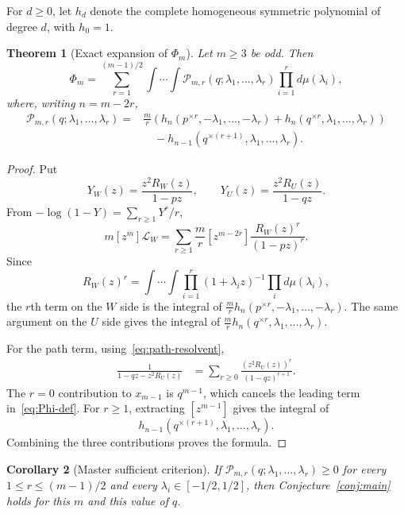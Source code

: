 \documentclass[11pt]{article}
\newtheorem{theorem}{Theorem}[section]
\newtheorem{corollary}[theorem]{Corollary}
\newcommand{\Pcal}{\mathcal P}
\begin{document}
For $d\ge0$, let $h_d$ denote the complete homogeneous symmetric polynomial of degree $d$, with $h_0=1$.

\begin{theorem}[Exact expansion of $\Phi_m$]\label{thm:expansion}
Let $m\ge3$ be odd.  Then
\begin{equation}\label{eq:Phi-expansion}
        \Phi_m=
        \sum_{r=1}^{(m-1)/2}\int\cdots\int
        \Pcal_{m,r}(q;\lambda_1,\ldots,\lambda_r)
        \prod_{i=1}^r d\mu(\lambda_i),
\end{equation}
where, writing $n=m-2r$,
\begin{equation}\label{eq:P-def}
\begin{aligned}
        \Pcal_{m,r}(q;\lambda_1,\ldots,\lambda_r)
        ={}&\frac mr\left(
        h_n(p^{\times r},-\lambda_1,\ldots,-\lambda_r)
        +h_n(q^{\times r},\lambda_1,\ldots,\lambda_r)
        \right)\\
        &\quad-h_{n-1}(q^{\times(r+1)},\lambda_1,\ldots,\lambda_r).
\end{aligned}
\end{equation}
\end{theorem}

\begin{proof}
Put
\[
        Y_W(z)=\frac{z^2R_W(z)}{1-pz},
        \qquad
        Y_U(z)=\frac{z^2R_U(z)}{1-qz}.
\]
From $-\log(1-Y)=\sum_{r\ge1}Y^r/r$,
\[
        m[z^m]\mathcal L_W
        =\sum_{r\ge1}\frac mr[z^{m-2r}]\frac{R_W(z)^r}{(1-pz)^r}.
\]
Since
\[
        R_W(z)^r=\int\cdots\int\prod_{i=1}^r(1+\lambda_iz)^{-1}\prod_i d\mu(\lambda_i),
\]
the $r$th term on the $W$ side is the integral of $\frac mr h_n(p^{\times r},-\lambda_1,\ldots,-\lambda_r)$.  The same argument on the $U$ side gives the integral of $\frac mr h_n(q^{\times r},\lambda_1,\ldots,\lambda_r)$.

For the path term, using~\eqref{eq:path-resolvent},
\[
\begin{aligned}
        \frac1{1-qz-z^2R_U(z)}
        &=\sum_{r\ge0}\frac{(z^2R_U(z))^r}{(1-qz)^{r+1}}.
\end{aligned}
\]
The $r=0$ contribution to $x_{m-1}$ is $q^{m-1}$, which cancels the leading term in~\eqref{eq:Phi-def}.  For $r\ge1$, extracting $[z^{m-1}]$ gives the integral of
\[
        h_{n-1}(q^{\times(r+1)},\lambda_1,\ldots,\lambda_r).
\]
Combining the three contributions proves the formula.
\end{proof}

\begin{corollary}[Master sufficient criterion]\label{cor:master}
If $\Pcal_{m,r}(q;\lambda_1,\ldots,\lambda_r)\ge0$ for every $1\le r\le(m-1)/2$ and every $\lambda_i\in[-1/2,1/2]$, then Conjecture~\ref{conj:main} holds for this $m$ and this value of $q$.
\end{corollary}
\end{document}
